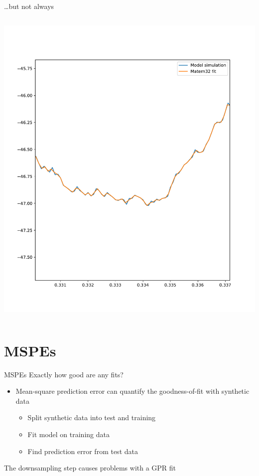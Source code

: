 \documentclass[presentation]{beamer}
\begin{document}
\begin{frame}[plain,label={sec:orgc853557}]{\ldots{}but not always}
\begin{columns}
\begin{column}{0.5\columnwidth}
\begin{center}
\includegraphics[width=1.1\textwidth]{./Matern6.pdf}
\end{center}
\end{column}
\end{columns}
\end{frame}


\section{MSPEs}
\label{sec:orgc0a7457}
\begin{frame}[label={sec:orgc27909d}]{MSPEs}
Exactly how good are any fits?
\vfill
\begin{itemize}
\item Mean-square prediction error can quantify the goodness-of-fit with synthetic data
\begin{itemize}
\item Split synthetic data into test and training
\item Fit model on training data
\item Find prediction error from test data
\end{itemize}
\end{itemize}

\vfill

The downsampling step causes problems with a GPR fit
\end{frame}
\end{document}
